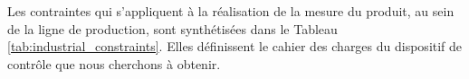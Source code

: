 


Les contraintes qui s'appliquent à la réalisation de la mesure du produit, au sein de la ligne de production, sont synthétisées dans le Tableau \ref{tab:industrial_constraints}.
Elles définissent le cahier des charges du dispositif de contrôle que nous cherchons à obtenir.

